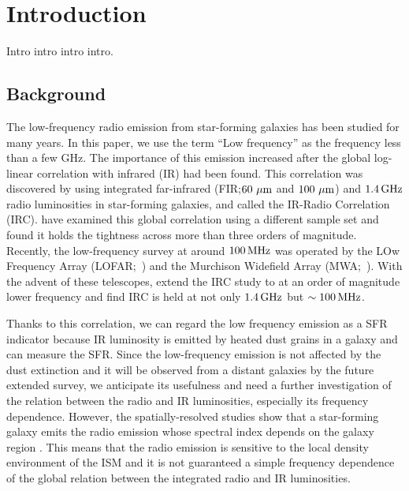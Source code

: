 \chapter{Introduction}
\begin{chapabstract}

Intro intro intro intro.

\end{chapabstract}
\section{Background}

The low-frequency radio emission from star-forming galaxies has been studied for many years.
In this paper, we use the term ``Low frequency'' as the frequency less than a few GHz.
The importance of this emission increased after the global log-linear correlation with infrared (IR) had been found.
This correlation was discovered by \citet{Helou1985} using integrated far-infrared (FIR;\@$60\,\,\mathrm{\mu m}$ and $100\,\,\mathrm{\mu m}$) and $1.4\,\mathrm{GHz}$ radio luminosities in star-forming galaxies, and called the IR-Radio Correlation (IRC).
\citet{Condon1991a,Yun2001a, Bell2003} have examined this global correlation using a different sample set and found it holds the tightness across more than three orders of magnitude.
Recently, the low-frequency survey at around $100\,\mathrm{MHz}$ was operated by the LOw Frequency Array (LOFAR;~\citealt{VanHaarlem2013}) and the Murchison Widefield Array (MWA;~\citealt{Tingay2013a}).
With the advent of these telescopes, \citet{CalistroRivera2017a, Read2018, Wang2019} extend the IRC study to at an order of magnitude lower frequency and find IRC is held at not only $1.4\,\mathrm{GHz}$ but $\sim 100\,\mathrm{MHz}$.

Thanks to this correlation, we can regard the low frequency emission as a SFR indicator because IR luminosity is emitted by heated dust grains in a galaxy and can measure the SFR\@.
Since the low-frequency emission is not affected by the dust extinction \citep{Yun2001a, Murphy2011} and it will be observed from a distant galaxies by the future extended survey, we anticipate its usefulness and need a further investigation of the relation between the radio and IR luminosities, especially its frequency dependence.
However, the spatially-resolved studies show that a star-forming galaxy emits the radio emission whose spectral index depends on the galaxy region \citep{Kapinska2017a, For2018a, Heesen2019}.
This means that the radio emission is sensitive to the local density environment of the ISM and it is not guaranteed a simple frequency dependence of the global relation between the integrated radio and IR luminosities.

